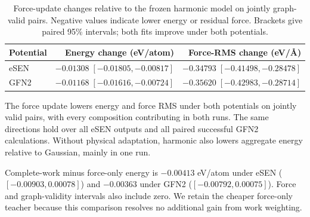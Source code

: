 \begin{table}[t]
\centering
\caption{Force-update changes relative to the frozen harmonic model on jointly graph-valid pairs. Negative values indicate lower energy or residual force. Brackets give paired 95\% intervals; both fits improve under both potentials.}
\small
\setlength{\tabcolsep}{4pt}
\begin{tabular}{lrr}
\toprule
Potential & Energy change (eV/atom) & Force-RMS change (eV/\AA)\\
\midrule
eSEN & $-0.01308\;[-0.01805,-0.00817]$ & $-0.34793\;[-0.41498,-0.28478]$\\
GFN2 & $-0.01168\;[-0.01616,-0.00724]$ & $-0.35620\;[-0.42983,-0.28714]$\\
\bottomrule
\end{tabular}\label{tab:fresh-physical}
\end{table}

The force update lowers energy and force RMS under both potentials on jointly valid pairs, with every composition contributing in both runs. The same directions hold over all eSEN outputs and all paired successful GFN2 calculations. Without physical adaptation, harmonic also lowers aggregate energy relative to Gaussian, mainly in one run.

Complete-work minus force-only energy is $-0.00413$ eV/atom under eSEN ($[-0.00903,0.00078]$) and $-0.00363$ under GFN2 ($[-0.00792,0.00075]$). Force and graph-validity intervals also include zero. We retain the cheaper force-only teacher because this comparison resolves no additional gain from work weighting.
